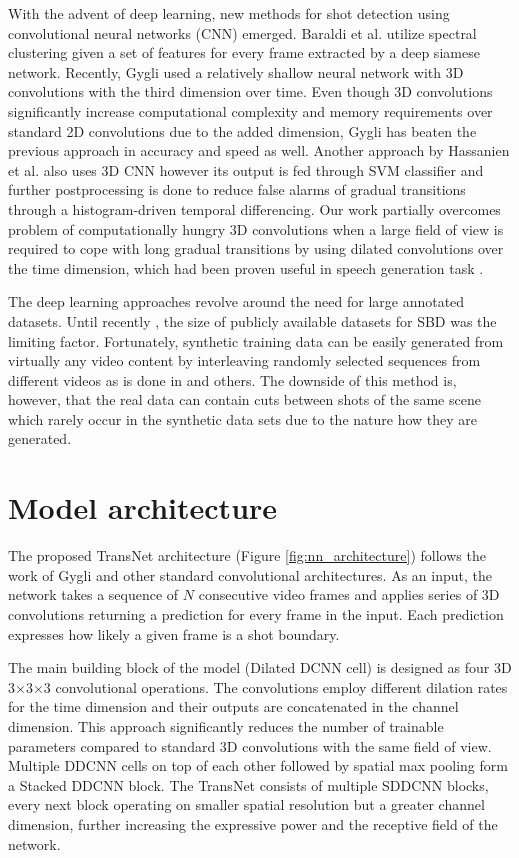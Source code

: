 With the advent of deep learning, new methods for shot detection using convolutional neural networks (CNN) emerged. Baraldi et al. \cite{Baraldi15} utilize spectral clustering given a set of features for every frame extracted by a deep siamese network. Recently, Gygli \cite{Gygli18} used a relatively shallow neural network with 3D convolutions with the third dimension over time. Even though 3D convolutions significantly increase computational complexity and memory requirements over standard 2D convolutions due to the added dimension, Gygli has beaten the previous approach in accuracy and speed as well. Another approach by Hassanien et al. \cite{Hassanien17} also uses 3D CNN however its output is fed through SVM classifier and further postprocessing is done to reduce false alarms of gradual transitions through a histogram-driven temporal differencing.
Our work partially overcomes problem of computationally hungry 3D convolutions when a large field of view is required to cope with long gradual transitions by using dilated convolutions over the time dimension, which had been proven useful in speech generation task \cite{oord16}.

The deep learning approaches revolve around the need for large annotated datasets. Until recently \cite{Tang2018}, the size of publicly available datasets for SBD was the limiting factor. Fortunately, synthetic training data can be easily generated from virtually any video content by interleaving randomly selected sequences from different videos as is done in \cite{Gygli18} and others. The downside of this method is, however, that the real data can contain cuts between shots of the same scene which rarely occur in the synthetic data sets due to the nature how they are generated.

\section{Model architecture}

The proposed TransNet architecture (Figure \ref{fig:nn_architecture}) follows the work of Gygli \cite{Gygli18} and other standard convolutional architectures. As an input, the network takes a sequence of $N$ consecutive video frames and applies series of 3D convolutions returning a prediction for every frame in the input. Each prediction expresses how likely a given frame is a shot boundary.

The main building block of the model (Dilated DCNN cell) is designed as four 3D 3$\times$3$\times$3 convolutional operations. The convolutions employ different dilation rates for the time dimension and their outputs are concatenated in the channel dimension. This approach significantly reduces the number of trainable parameters compared to standard 3D convolutions with the same field of view. Multiple DDCNN cells on top of each other followed by spatial max pooling form a Stacked DDCNN block. The TransNet consists of multiple SDDCNN blocks, every next block operating on smaller spatial resolution but a greater channel dimension, further increasing the expressive power and the receptive field of the network.

